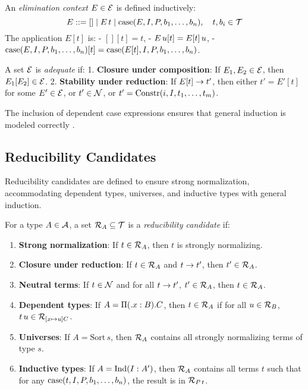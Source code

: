 \documentclass{article}
\begin{document}
\begin{definition}
An \emph{elimination context} \(E \in \mathcal{E}\) is defined inductively:
\[
E ::= [] \mid E \, t \mid \text{case}(E, I, P, b_1, \dots, b_n), \quad t, b_i \in \mathcal{T}
\]
The application \(E[t]\) is:
- \([] [t] = t\),
- \(E \, u [t] = E[t] \, u\),
- \(\text{case}(E, I, P, b_1, \dots, b_n) [t] = \text{case}(E[t], I, P, b_1, \dots, b_n)\).

A set \(\mathcal{E}\) is \emph{adequate} if:
1. \textbf{Closure under composition}: If \(E_1, E_2 \in \mathcal{E}\), then \(E_1[E_2] \in \mathcal{E}\).
2. \textbf{Stability under reduction}: If \(E[t] \to t'\), then either \(t' = E'[t]\) for some \(E' \in \mathcal{E}\), or \(t' \in \mathcal{N}\), or \(t' = \text{Constr}(i, I, t_1, \dots, t_m)\).
\end{definition}

The inclusion of dependent case expressions ensures that general induction
is modeled correctly \cite{werner1994}.

\newpage
\subsection{Reducibility Candidates}
Reducibility candidates are defined to ensure strong normalization,
accommodating dependent types, universes, and inductive types with general induction.

\begin{definition}
For a type \(A \in \mathcal{A}\), a set \(\mathcal{R}_A \subseteq \mathcal{T}\) is a \emph{reducibility candidate} if:
\begin{enumerate}
  \item \textbf{Strong normalization}: If \(t \in \mathcal{R}_A\), then \(t\) is strongly normalizing.
  \item \textbf{Closure under reduction}: If \(t \in \mathcal{R}_A\) and \(t \to t'\), then \(t' \in \mathcal{R}_A\).
  \item \textbf{Neutral terms}: If \(t \in \mathcal{N}\) and for all \(t \to t'\), \(t' \in \mathcal{R}_A\), then \(t \in \mathcal{R}_A\).
  \item \textbf{Dependent types}: If \(A = \Pi ( . x : B). C\), then \(t \in \mathcal{R}_A\) if for all \(u \in \mathcal{R}_B\), \(t \, u \in \mathcal{R}_{[x \mapsto u] C}\).
  \item \textbf{Universes}: If \(A = \text{Sort} \, s\), then \(\mathcal{R}_A\) contains all strongly normalizing terms of type \(s\).
  \item \textbf{Inductive types}: If \(A = \text{Ind}(I : A')\), then \(\mathcal{R}_A\) contains all terms \(t\) such that for any \(\text{case}(t, I, P, b_1, \dots, b_n)\), the result is in \(\mathcal{R}_{P \, t}\).
\end{enumerate}
\end{definition}
\end{document}
